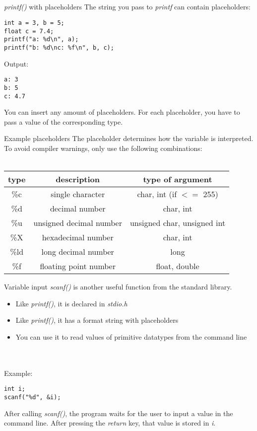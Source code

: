 \subsection{}
\begin{frame}[fragile]{\textit{printf()} with placeholders}
	The string you pass to \textit{printf} can contain placeholders:
	\begin{lstlisting}[numbers=none]
int a = 3, b = 5;
float c = 7.4;
printf("a: %d\n", a);
printf("b: %d\nc: %f\n", b, c);
\end{lstlisting}
Output:\begin{lstlisting}[numbers=none]
a: 3
b: 5
c: 4.7
\end{lstlisting}
You can insert any amount of placeholders. For each placeholder, you have to pass a value of the corresponding type.
\end{frame}
\begin{frame}{Example placeholders}
	The placeholder determines how the variable is interpreted.
	To avoid compiler warnings, only use the following combinations: \\ \ \\
	\begin{tabular}{|c|c|c|}
		\hline
		\textbf{type} & \textbf{description} & \textbf{type of argument} \\\hline
		\%c & single character & char, int (if $<=$ 255) \\\hline
		\%d & decimal number & char, int \\\hline
		\%u & unsigned decimal number & unsigned char, unsigned int \\\hline
		\%X & hexadecimal number & char, int \\\hline
		\%ld & long decimal number & long \\\hline
		\%f & floating point number & float, double \\\hline
	\end{tabular}
\end{frame}
\begin{frame}[fragile]{Variable input}
	\textit{scanf()} is another useful function from the standard library.
	\begin{itemize}
		\item Like \textit{printf()}, it is declared in \textit{stdio.h}
		\item Like \textit{printf()}, it has a format string with placeholders
		\item You can use it to read values of primitive datatypes from the command line
	\end{itemize}
	\ \\ \ \\ Example:
	\begin{lstlisting}[numbers=none]
int i;
scanf("%d", &i);	
\end{lstlisting}
	After calling \textit{scanf()}, the program waits for the user to input a value in the command line.
	After pressing the \textit{return} key, that value is stored in \textit{i}.
\end{frame}
